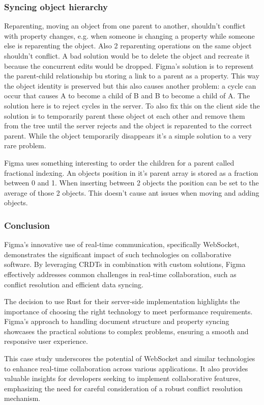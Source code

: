 \subsubsection*{Syncing object hierarchy}

Reparenting, moving an object from one parent to another, shouldn't conflict with property changes, e.g. when someone is changing a property while someone else is reparenting the object. Also 2 reparenting operations on the same object shouldn't conflict. A bad solution would be to delete the object and recreate it because the concurrent edits would be dropped. Figma's solution is to represent the parent-child relationship bu storing a link to a parent as a property. This way the object identity is preserved but this also causes another problem: a cycle can occur that causes A to become a child of B and B to become a child of A. The solution here is to reject cycles in the server. To also fix this on the client side the solution is to temporarily parent these object ot each other and remove them from the tree until the server rejects and the object is reparented to the correct parent. While the object temporarily disappears it's a simple solution to a very rare problem.

Figma uses something interesting to order the children for a parent called fractional indexing. An objects position in it's parent array is stored as a fraction between 0 and 1. When inserting between 2 objects the position can be set to the average of those 2 objects. This doesn't cause ant issues when moving and adding objects.

\subsubsection*{Conclusion}

Figma's innovative use of real-time communication, specifically WebSocket, demonstrates the significant impact of such technologies on collaborative software. By leveraging CRDTs in combination with custom solutions, Figma effectively addresses common challenges in real-time collaboration, such as conflict resolution and efficient data syncing.

The decision to use Rust for their server-side implementation highlights the importance of choosing the right technology to meet performance requirements. Figma's approach to handling document structure and property syncing showcases the practical solutions to complex problems, ensuring a smooth and responsive user experience.

This case study underscores the potential of WebSocket and similar technologies to enhance real-time collaboration across various applications. It also provides valuable insights for developers seeking to implement collaborative features, emphasizing the need for careful consideration of a robust conflict resolution mechanism.
